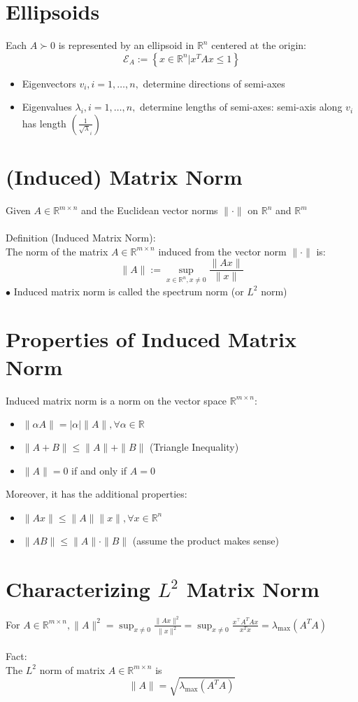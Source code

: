 \documentclass[10pt,a4paper,oneside]{article}
\begin{document}
\section{Ellipsoids}
Each $A\succ0$ is represented by an ellipsoid in $\mathbb{R}^{n}$ centered at the origin:
\[
\mathcal{E}_{A} :=\left\{x \in \mathbb{R}^{n} | x^{T} A x \leq 1\right\}
\]
\begin{itemize}
\item Eigenvectors $v_{i}, i=1, \ldots, n,$ determine directions of semi-axes
\item Eigenvalues $\lambda_{i}, i=1, \ldots, n,$ determine lengths of semi-axes:
semi-axis along $v_{i}$ has length $\left(\frac{1}{\sqrt{\lambda}_{i}}\right)$
\end{itemize}
\section{(Induced) Matrix Norm}
Given $A \in \mathbb{R}^{m \times n}$ and the Euclidean vector norms $\|\cdot\|$ on $\mathbb{R}^{n}$ and $\mathbb{R}^{m}$\\
\\Definition (Induced Matrix Norm):\\
The norm of the matrix $A \in \mathbb{R}^{m \times n}$ induced from the vector norm $\|\cdot\|$ is:
\[
\|A\| :=\sup _{x \in \mathbb{R}^{n}, x \neq 0} \frac{\|A x\|}{\|x\|}
\]
$\bullet$ Induced matrix norm is called the spectrum norm (or $L^{2}$ norm)
\section{Properties of Induced Matrix Norm}
Induced matrix norm is a norm on the vector space $\mathbb{R}^{m \times n}$:
\begin{itemize}
\item $\|\alpha A\|=|\alpha|\|A\|, \forall \alpha \in \mathbb{R}$
\item $\|A+B\| \leq\|A\|+\|B\|$ (Triangle Inequality)
\item $\|A\|=0$ if and only if $A=0$
\end{itemize}
Moreover, it has the additional properties:
\begin{itemize}
\item $\|A x\| \leq\|A\|\|x\|, \forall x \in \mathbb{R}^{n}$
\item $\|A B\| \leq\|A\| \cdot\|B\|$ (assume the product makes sense)
\end{itemize}
\section{Characterizing $L^{2}$ Matrix Norm}
For $A \in \mathbb{R}^{m \times n},\|A\|^{2}=\sup _{x \neq 0} \frac{\|A x\|^{2}}{\|x\|^{2}}=\sup _{x \neq 0} \frac{x^{\top} A^{T} A x}{x^{T} x}=\lambda_{\max }\left(A^{T} A\right)$\\
\\Fact:\\
The $L^{2}$ norm of matrix $A \in \mathbb{R}^{m \times n}$ is
\[
\|A\|=\sqrt{\lambda_{\max }\left(A^{T} A\right)}
\]
\end{document}
